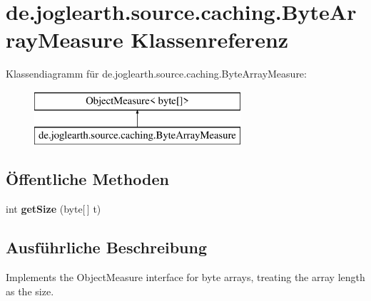 \section{de.\-joglearth.\-source.\-caching.\-Byte\-Array\-Measure Klassenreferenz}
\label{classde_1_1joglearth_1_1source_1_1caching_1_1_byte_array_measure}
Klassendiagramm für de.\-joglearth.\-source.\-caching.\-Byte\-Array\-Measure\-:\begin{figure}[H]
\begin{center}
\leavevmode
\includegraphics[height=2.000000cm]{classde_1_1joglearth_1_1source_1_1caching_1_1_byte_array_measure}
\end{center}
\end{figure}
\subsection*{Öffentliche Methoden}
\begin{DoxyCompactItemize}
\item 
int {\bfseries get\-Size} (byte[$\,$] t)\label{classde_1_1joglearth_1_1source_1_1caching_1_1_byte_array_measure_a637b140ddd22755079baf47401d8fa7f}

\end{DoxyCompactItemize}


\subsection{Ausführliche Beschreibung}
Implements the Object\-Measure interface for byte arrays, treating the array length as the size. 